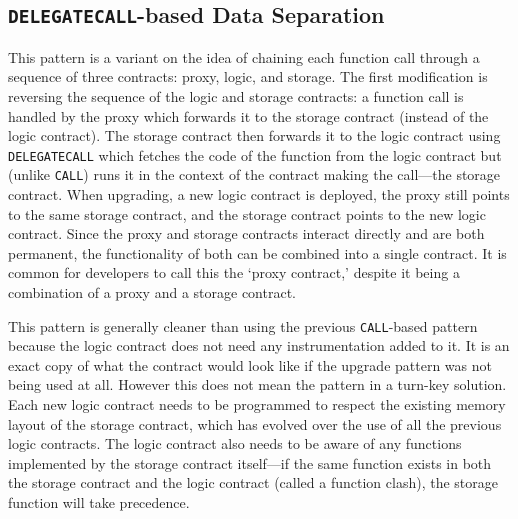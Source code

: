 
\subsection{\texttt{DELEGATECALL}-based Data Separation}
\label{sec:delegatecall}


This pattern is a variant on the idea of chaining each function call through a sequence of three contracts: proxy, logic, and storage. The first modification is reversing the sequence of the logic and storage contracts: a function call is handled by the proxy which forwards it to the storage contract (instead of the logic contract). The storage contract then forwards it to the logic contract using \texttt{DELEGATECALL} which fetches the code of the function from the logic contract but (unlike \texttt{CALL}) runs it in the context of the contract making the call---\ie the storage contract. When upgrading, a new logic contract is deployed, the proxy still points to the same storage contract, and the storage contract points to the new logic contract. Since the proxy and storage contracts interact directly and are both permanent, the functionality of both can be combined into a single contract. It is common for developers to call this the `proxy contract,' despite it being a combination of a proxy and a storage contract. 

This pattern is generally cleaner than using the previous \texttt{CALL}-based pattern because the logic contract does not need any instrumentation added to it. It is an exact copy of what the contract would look like if the upgrade pattern was not being used at all. However this does not mean the pattern in a turn-key solution. Each new logic contract needs to be programmed to respect the existing memory layout of the storage contract, which has evolved over the use of all the previous logic contracts. The logic contract also needs to be aware of any functions implemented by the storage contract itself---if the same function exists in both the storage contract and the logic contract (called a function clash), the storage function will take precedence.

